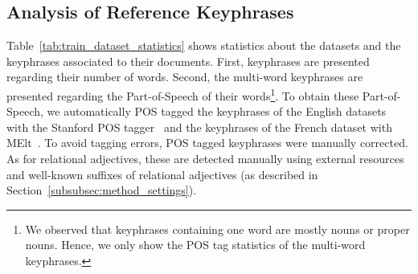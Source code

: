   \subsection{Analysis of Reference Keyphrases}
  \label{subsec:keyphrase_analysis}
    Table~\ref{tab:train_dataset_statistics} shows statistics about the datasets
    and the keyphrases associated to their documents. First, keyphrases are 
    presented regarding their number of words. Second, the multi-word keyphrases
    are presented regarding the Part-of-Speech of their words\footnote{We
    observed that keyphrases containing one word are mostly nouns or proper
    nouns. Hence, we only show the POS tag statistics of the multi-word
    keyphrases.}. To obtain these Part-of-Speech, we automatically POS tagged
    the keyphrases of the English datasets with the Stanford POS
    tagger~\cite{toutanova2003stanfordpostagger} and the keyphrases of the
    French dataset with MElt~\cite{denis2009melt}. To avoid tagging errors, POS
    tagged keyphrases were manually corrected. As for relational adjectives,
    these are detected manually using external resources and well-known suffixes
    of relational adjectives (as described in
    Section~\ref{subsubsec:method_settings}).
    
